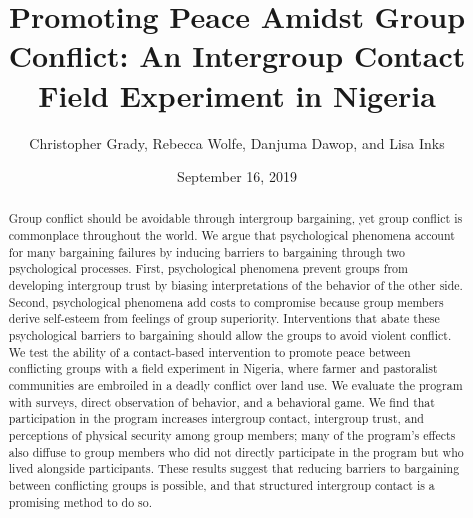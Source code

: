 \documentclass[11pt]{article}
\title{Promoting Peace Amidst Group Conflict: An Intergroup Contact Field
Experiment in Nigeria}
\author{
Christopher Grady, Rebecca Wolfe, Danjuma Dawop, and Lisa Inks
}
\date{September 16, 2019}
\begin{document}
\VerbatimFootnotes

%
%
%
%
%
%
%
%
%
%

\maketitle

\begin{abstract}

Group conflict should be avoidable through intergroup bargaining, yet group conflict is commonplace throughout the world.  We argue that psychological phenomena account for many bargaining failures by inducing barriers to bargaining through two psychological processes.  First, psychological phenomena prevent groups from developing intergroup trust by biasing interpretations of the behavior of the other side.  Second, psychological phenomena add costs to compromise because group members derive self-esteem from feelings of group superiority.  Interventions that abate these psychological barriers to bargaining should allow the groups to avoid violent conflict.  We test the ability of a contact-based intervention to promote peace between conflicting groups with a field experiment in Nigeria, where farmer and pastoralist communities are embroiled in a deadly conflict over land use.  We evaluate the program with surveys, direct observation of behavior, and a behavioral game.  We find that participation in the program increases intergroup contact, intergroup trust, and perceptions of physical security among group members; many of the program's effects also diffuse to group members who did not directly participate in the program but who lived alongside participants.  These results suggest that reducing barriers to bargaining between conflicting groups is possible, and that structured intergroup contact is a promising method to do so.

\end{abstract}
\end{document}
